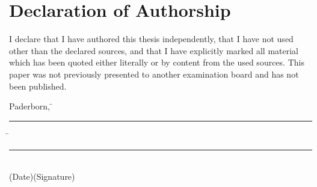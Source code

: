 \chapter{Declaration of Authorship}
\thispagestyle{empty}

I declare that I have authored this thesis independently, that I have not used other than the declared sources, and that I have explicitly marked all material which has been quoted either literally or by content from the used sources. This paper was not previously presented to another examination board and has not been published.


\begin{tabbing}
Paderborn, \hspace{0.4cm} \= \rule[-0.15\baselineskip]{5cm}{.4pt}  \hspace{0.7cm}\= \rule[-0.15\baselineskip]{6cm}{.4pt}\\
\renewcommand{\baselinestretch}{0.5}\normalsize
\>\small{(Date)}\>\small{(Signature)}
\end{tabbing}
\renewcommand{\baselinestretch}{1}\normalsize
